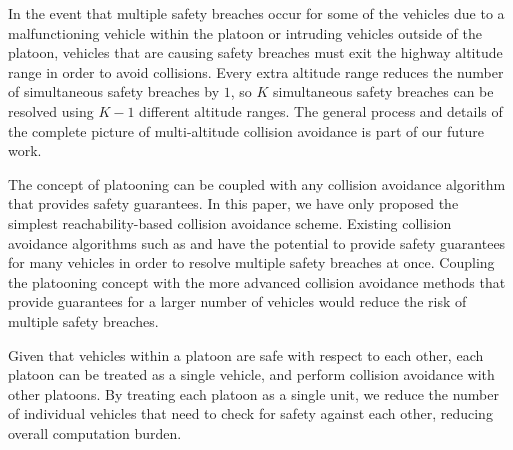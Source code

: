 In the event that multiple safety breaches occur for some of the vehicles due to a malfunctioning vehicle within the platoon or intruding vehicles outside of the platoon, vehicles that are causing safety breaches must exit the highway altitude range in order to avoid collisions. Every extra altitude range reduces the number of simultaneous safety breaches by $1$, so $K$ simultaneous safety breaches can be resolved using $K-1$ different altitude ranges. The general process and details of the complete picture of multi-altitude collision avoidance is part of our future work. 

The concept of platooning can be coupled with any collision avoidance algorithm that provides safety guarantees. In this paper, we have only proposed the simplest reachability-based collision avoidance scheme. Existing collision avoidance algorithms such as \cite{Bansal16} and \cite{Chen16} have the potential to provide safety guarantees for many vehicles in order to resolve multiple safety breaches at once. Coupling the platooning concept with the more advanced collision avoidance methods that provide guarantees for a larger number of vehicles would reduce the risk of multiple safety breaches.

Given that vehicles within a platoon are safe with respect to each other, each platoon can be treated as a single vehicle, and perform collision avoidance with other platoons. By treating each platoon as a single unit, we reduce the number of individual vehicles that need to check for safety against each other, reducing overall computation burden.